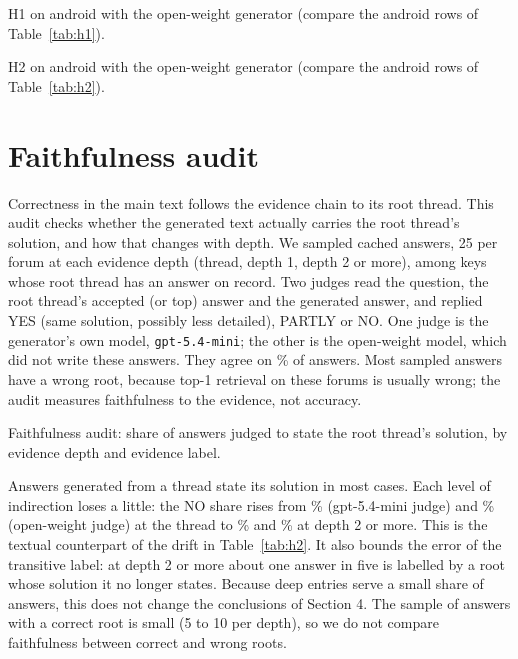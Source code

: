 \documentclass[11pt]{article}
\begin{document}
\begin{table}[h]\centering\small
\caption{H1 on android with the open-weight generator (compare the android rows of Table~\ref{tab:h1}).}\label{tab:h1local}
\begin{adjustbox}{max width=\linewidth, max totalheight=0.85\textheight}\end{adjustbox}
\end{table}
\begin{table}[h]\centering\small
\caption{H2 on android with the open-weight generator (compare the android rows of Table~\ref{tab:h2}).}\label{tab:h2local}
\begin{adjustbox}{max width=\linewidth, max totalheight=0.85\textheight}\end{adjustbox}
\end{table}

\section{Faithfulness audit}\label{app:audit}
Correctness in the main text follows the evidence chain to its root thread. This audit checks whether the generated text actually carries the root thread's solution, and how that changes with depth. We sampled \nAudit{} cached answers, 25 per forum at each evidence depth (thread, depth 1, depth 2 or more), among keys whose root thread has an answer on record. Two judges read the question, the root thread's accepted (or top) answer and the generated answer, and replied YES (same solution, possibly less detailed), PARTLY or NO. One judge is the generator's own model, \texttt{gpt-5.4-mini}; the other is the open-weight model, which did not write these answers. They agree on \auditAgree{}\% of answers. Most sampled answers have a wrong root, because top-1 retrieval on these forums is usually wrong; the audit measures faithfulness to the evidence, not accuracy.

\begin{table}[h]\centering\small
\caption{Faithfulness audit: share of answers judged to state the root thread's solution, by evidence depth and evidence label.}\label{tab:audit}

\end{table}

Answers generated from a thread state its solution in most cases. Each level of indirection loses a little: the NO share rises from \auditNoAzZero{}\% (gpt-5.4-mini judge) and \auditNoLocZero{}\% (open-weight judge) at the thread to \auditNoAzTwo{}\% and \auditNoLocTwo{}\% at depth 2 or more. This is the textual counterpart of the drift in Table~\ref{tab:h2}. It also bounds the error of the transitive label: at depth 2 or more about one answer in five is labelled by a root whose solution it no longer states. Because deep entries serve a small share of answers, this does not change the conclusions of Section 4. The sample of answers with a correct root is small (5 to 10 per depth), so we do not compare faithfulness between correct and wrong roots.
\end{document}
